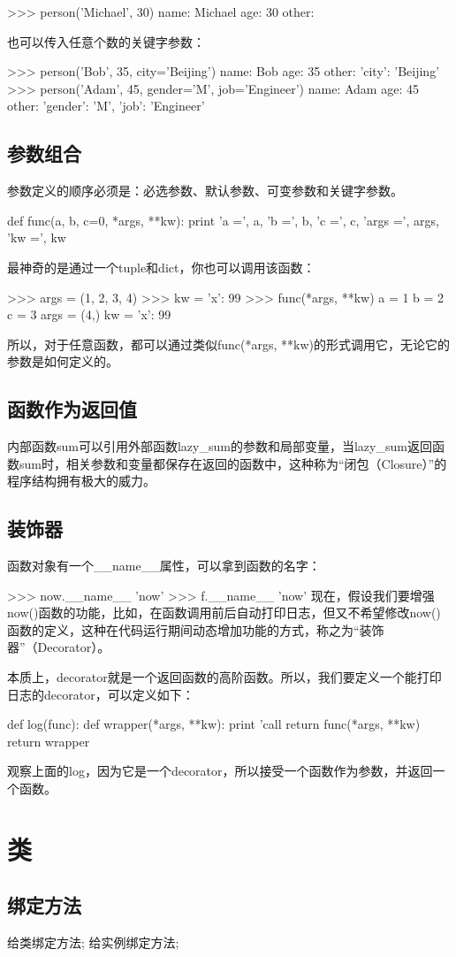 >>> person('Michael', 30)
name: Michael age: 30 other: {}

也可以传入任意个数的关键字参数：

>>> person('Bob', 35, city='Beijing')
name: Bob age: 35 other: {'city': 'Beijing'}
>>> person('Adam', 45, gender='M', job='Engineer')
name: Adam age: 45 other: {'gender': 'M', 'job': 'Engineer'}
\section{参数组合}
参数定义的顺序必须是：必选参数、默认参数、可变参数和关键字参数。

def func(a, b, c=0, *args, **kw):
    print 'a =', a, 'b =', b, 'c =', c, 'args =', args, 'kw =', kw
    
最神奇的是通过一个tuple和dict，你也可以调用该函数：

>>> args = (1, 2, 3, 4)
>>> kw = {'x': 99}
>>> func(*args, **kw)
a = 1 b = 2 c = 3 args = (4,) kw = {'x': 99}

所以，对于任意函数，都可以通过类似func(*args, **kw)的形式调用它，无论它的参数是如何定义的。
\section{函数作为返回值}
内部函数sum可以引用外部函数lazy_sum的参数和局部变量，当lazy_sum返回函数sum时，相关参数和变量都保存在返回的函数中，这种称为“闭包（Closure）”的程序结构拥有极大的威力。
\section{装饰器}
函数对象有一个__name__属性，可以拿到函数的名字：

>>> now.__name__
'now'
>>> f.__name__
'now'
现在，假设我们要增强now()函数的功能，比如，在函数调用前后自动打印日志，但又不希望修改now()函数的定义，这种在代码运行期间动态增加功能的方式，称之为“装饰器”（Decorator）。

本质上，decorator就是一个返回函数的高阶函数。所以，我们要定义一个能打印日志的decorator，可以定义如下：

def log(func):
    def wrapper(*args, **kw):
        print 'call %
        return func(*args, **kw)
    return wrapper

观察上面的log，因为它是一个decorator，所以接受一个函数作为参数，并返回一个函数。
\chapter{类}
\section{绑定方法}
给类绑定方法;
给实例绑定方法;
